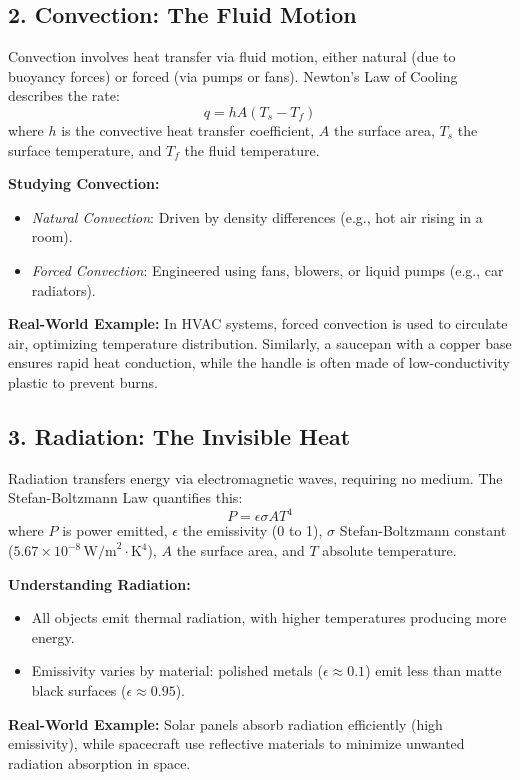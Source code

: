 \documentclass[12pt]{article}
\begin{document}
\subsection*{2. Convection: The Fluid Motion}
Convection involves heat transfer via fluid motion, either natural (due to buoyancy forces) or forced (via pumps or fans). Newton's Law of Cooling describes the rate:
$$
q = h A (T_s - T_f)
$$
where $ h $ is the convective heat transfer coefficient, $ A $ the surface area, $ T_s $ the surface temperature, and $ T_f $ the fluid temperature.

\textbf{Studying Convection:}
\begin{itemize}
    \item \textit{Natural Convection}: Driven by density differences (e.g., hot air rising in a room).
    \item \textit{Forced Convection}: Engineered using fans, blowers, or liquid pumps (e.g., car radiators).
\end{itemize}

\textbf{Real-World Example:} In HVAC systems, forced convection is used to circulate air, optimizing temperature distribution. Similarly, a saucepan with a copper base ensures rapid heat conduction, while the handle is often made of low-conductivity plastic to prevent burns.

\subsection*{3. Radiation: The Invisible Heat}
Radiation transfers energy via electromagnetic waves, requiring no medium. The Stefan-Boltzmann Law quantifies this:
$$
P = \epsilon \sigma A T^4
$$
where $ P $ is power emitted, $ \epsilon $ the emissivity (0 to 1), $ \sigma $ Stefan-Boltzmann constant ($ 5.67 \times 10^{-8} \, \text{W/m}^2\cdot\text{K}^4 $), $ A $ the surface area, and $ T $ absolute temperature.

\textbf{Understanding Radiation:}
\begin{itemize}
    \item All objects emit thermal radiation, with higher temperatures producing more energy.
    \item Emissivity varies by material: polished metals ($ \epsilon \approx 0.1 $) emit less than matte black surfaces ($ \epsilon \approx 0.95 $).
\end{itemize}

\textbf{Real-World Example:} Solar panels absorb radiation efficiently (high emissivity), while spacecraft use reflective materials to minimize unwanted radiation absorption in space.
\end{document}

